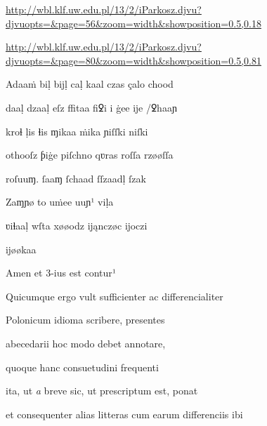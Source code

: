 
\newParkoszpage

{
\url{http://wbl.klf.uw.edu.pl/13/2/iParkosz.djvu?djvuopts=&page=56&zoom=width&showposition=0.5,0.18}

\url{http://wbl.klf.uw.edu.pl/13/2/iParkosz.djvu?djvuopts=&page=80&zoom=width&showposition=0.5,0.81}
}

\bigskip

\obeylines
\mono

\fulllines









\fulllines

Adaaṁ biḷ bĳḷ caḷ kaal czas çalo chood 

daaḷ dzaaḷ eſz ﬀitaa fiꝿi i ġee ĳe /ꝿhaaɲ 

kroɬ ḷis ɬis ɱikaa ṁika ɲiſſki niſki 

othooſz ƥiġe piſchno qʋras roſſa rzøøſſa 

roſuuɱ. ſaaɱ ſchaad ſſzaadḷ ſzak 

 Zaɱɲø to uṁee uuɲ¹ viḷa 

ʋiɬaaḷ wſta xøøodz ĳąnczøc ĳoczi

ĳøøkaa

Amen et 3-ius est contur¹

Quicumque ergo vult sufficienter ac differencialiter

Polonicum idioma scribere, presentes 

 abecedarii hoc modo debet annotare, 

 quoque hanc consuetudini frequenti 

 ita, ut \textit{a} breve sic, ut prescriptum est, ponat 

et consequenter alias litteras cum earum differenciis ibi 

